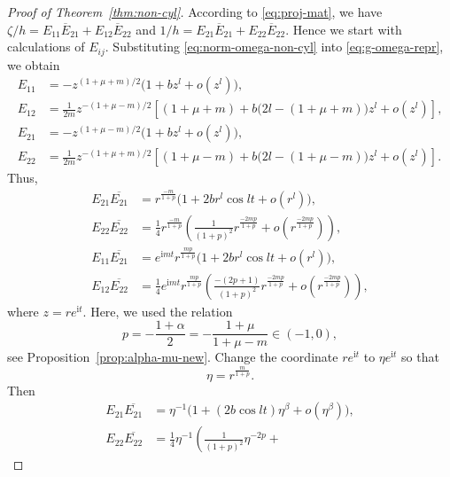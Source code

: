 \documentclass[a4paper]{amsart}
\theoremstyle{plain}
\theoremstyle{remark}
\numberwithin{equation}{section}
\begin{document}
\begin{proof}[Proof of Theorem~\ref{thm:non-cyl}]
 According to \eqref{eq:proj-mat},
 we have $\zeta/h=E_{11}\overline{E}_{21}+E_{12}\overline{E}_{22}$ and
 $1/h=E_{21}\overline{E}_{21}+E_{22}\overline{E}_{22}$.
 Hence we start with calculations of $E_{ij}$.
 Substituting \eqref{eq:norm-omega-non-cyl} into
 \eqref{eq:g-omega-repr},
 we obtain
 \begin{align*}
  E_{11}&=  -z^{(1+\mu+m)/2}\bigl(1+bz^l+o(z^l)\bigr),\\
  E_{12}&=  \frac{1}{2m}z^{-(1+\mu-m)/2}
              \left[
            (1+\mu+m)+b\bigl(2l-(1+\mu+m)\bigr)z^l+o(z^l)
              \right],\\
  E_{21}&=  -z^{(1+\mu-m)/2}\bigl(1+bz^l+o(z^l)\bigr),\\
  E_{22}&=  \frac{1}{2m}z^{-(1+\mu+m)/2}
              \left[(1+\mu-m)+b\bigl(2l-(1+\mu-m)\bigr)z^{l}+o(z^l)
              \right].
 \end{align*}
 Thus, 
 \begin{equation}\label{eq:ccdd}
 \begin{aligned}
  E_{21}\overline{E_{21}} &= 
    r^{\frac{-m}{1+p}}\bigl(1+2br^l \cos l t+o(r^l)\bigr),\\
  E_{22}\overline{E_{22}} &= \frac{1}{4}r^{\frac{-m}{1+p}}
              \left(
                \frac{1}{(1+p)^2}r^{\frac{-2mp}{1+p}}+
                   o(r^{\frac{-2mp}{1+p}})
              \right),\\
  E_{11}\overline {E_{21}}&=
           e^{{\mathrm{i}} m t}r^{\frac{mp}{1+p}}
           \bigl(1 + 2 b r^l \cos l t + o (r^l)\bigr),\\
  E_{12}\overline{E_{22}} &=
           \frac{1}{4} e^{{\mathrm{i}} m t}r^{\frac{mp}{1+p}}
           \left(\frac{-(2p+1)}{(1+p)^2} r^{\frac{-2mp}{1+p}}+
                   o(r^{\frac{-2mp}{1+p}}) \right),
 \end{aligned}
 \end{equation}
 where $z=re^{{\mathrm{i}} t}$.
 Here, we used the relation 
 \[
     p = -\frac{1+\alpha}{2} = -\frac{1+\mu}{1+\mu-m}\in (-1,0),
 \]
 see Proposition~\ref{prop:alpha-mu-new}.
 Change the coordinate $r e^{{\mathrm{i}} t}$ to $\eta e^{{\mathrm{i}} t}$
 so that
 \[
     \eta=r^{\frac{m}{1+p}}.
 \]
 Then 
 \begin{equation}\label{eq:ccdd-tau}
 \begin{aligned}
  E_{21}\overline{E_{21}} 
     &= \eta^{-1}\bigl(1+(2b  \cos l t)\eta^\beta+o(\eta^\beta)\bigr),\\
  E_{22}\overline{E_{22}} &= \frac{1}{4}\eta^{-1}
              \left(
                \frac{1}{(1+p)^2}\eta^{-2p}+

\end{aligned}
\end{equation}
\end{proof}
\end{document}
